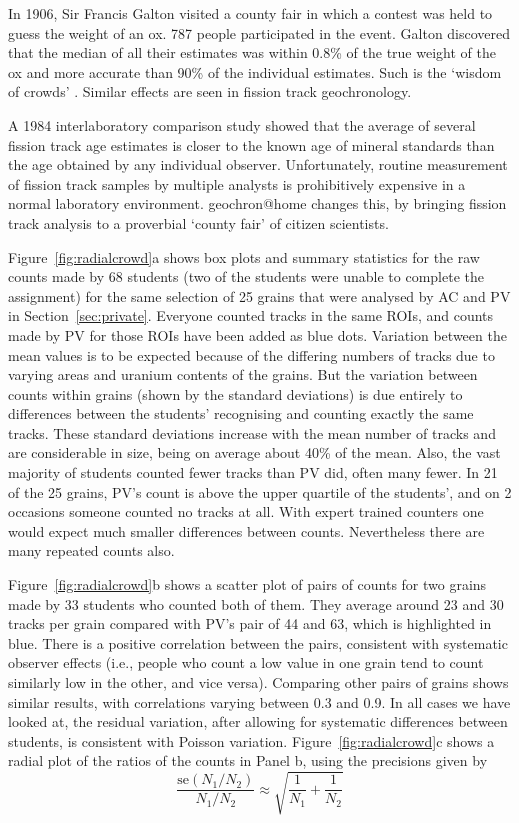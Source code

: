 \documentclass[gchron, manuscript]{copernicus}
\begin{document}
In 1906, Sir Francis Galton visited a county fair in which a contest
was held to guess the weight of an ox. 787 people participated in the
event. Galton discovered that the median of all their estimates was
within 0.8\% of the true weight of the ox and more accurate than 90\%
of the individual estimates. Such is the `wisdom of crowds'
\citep{galton1907a}. Similar effects are seen in fission track
geochronology.\medskip

A 1984 interlaboratory comparison study \citep{miller1985} showed that
the average of several fission track age estimates is closer to the
known age of mineral standards than the age obtained by any individual
observer. Unfortunately, routine measurement of fission track samples
by multiple analysts is prohibitively expensive in a normal laboratory
environment. geochron@home changes this, by bringing fission track
analysis to a proverbial `county fair' of citizen scientists.\medskip

Figure~\ref{fig:radialcrowd}a shows box plots and summary statistics
for the raw counts made by 68 students (two of the students were
unable to complete the assignment) for the same selection of 25 grains
that were analysed by AC and PV in Section~\ref{sec:private}. Everyone
counted tracks in the same ROIs, and counts made by PV for those ROIs
have been added as blue dots.  Variation between the mean values is to
be expected because of the differing numbers of tracks due to varying
areas and uranium contents of the grains. But the variation between
counts within grains (shown by the standard deviations) is due
entirely to differences between the students' recognising and counting
exactly the same tracks. These standard deviations increase with the
mean number of tracks and are considerable in size, being on average
about 40\% of the mean.  Also, the vast majority of students counted
fewer tracks than PV did, often many fewer. In 21 of the 25 grains,
PV's count is above the upper quartile of the students', and on 2
occasions someone counted no tracks at all.  With expert trained
counters one would expect much smaller differences between counts.
Nevertheless there are many repeated counts also.\medskip

Figure~\ref{fig:radialcrowd}b shows a scatter plot of pairs of counts
for two grains made by 33 students who counted both of them. They
average around 23 and 30 tracks per grain compared with PV's pair of
44 and 63, which is highlighted in blue. There is a positive
correlation between the pairs, consistent with systematic observer
effects (i.e., people who count a low value in one grain tend to count
similarly low in the other, and vice versa).  Comparing other pairs of
grains shows similar results, with correlations varying between 0.3
and 0.9. In all cases we have looked at, the residual variation, after
allowing for systematic differences between students, is consistent
with Poisson variation.  Figure~\ref{fig:radialcrowd}c shows a radial
plot of the ratios of the counts in Panel b, using the precisions
given by
\begin{equation}
  \frac{\mbox{se}(N_1/N_2)}{N_1/N_2}
  \approx
  \sqrt{
    \frac{1}{N_1} + \frac{1}{N_2}
  }
  \label{eq:N12}
\end{equation}
\end{document}

